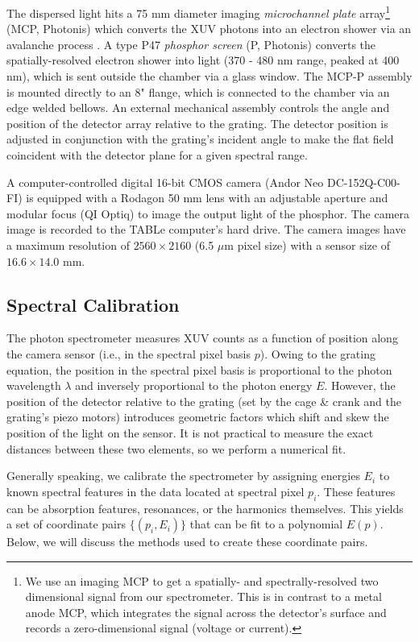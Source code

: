 The dispersed light hits a 75 mm diameter imaging \textit{microchannel plate} array\footnote{We use an imaging MCP to get a spatially- and spectrally-resolved two dimensional signal from our spectrometer. This is in contrast to a metal anode MCP, which integrates the signal across the detector's surface and records a zero-dimensional signal (voltage or current).} (MCP, Photonis) which converts the XUV photons into an electron shower via an avalanche process \cite{ladislaswizaMicrochannelPlateDetectors1979a,fraserGrayImagingUsing1984}. A type P47 \textit{phosphor screen} (P, Photonis) converts the spatially-resolved electron shower into light (370 - 480 nm range, peaked at 400 nm), which is sent outside the chamber via a glass window. The MCP-P assembly is mounted directly to an 8" flange, which is connected to the chamber via an edge welded bellows. An external mechanical assembly controls the angle and position of the detector array relative to the grating. The detector position is adjusted in conjunction with the grating's incident angle to make the flat field coincident with the detector plane for a given spectral range.

A computer-controlled digital 16-bit CMOS camera (Andor Neo DC-152Q-C00-FI) is equipped with a Rodagon 50 mm lens with an adjustable aperture and modular focus (QI Optiq) to image the output light of the phosphor. The camera image is recorded to the TABLe computer's hard drive. The camera images have a maximum resolution of $2560 \times 2160$ (6.5 $\mu$m pixel size) with a sensor size of $16.6 \times 14.0$ mm.

\subsection{Spectral Calibration}
\label{sec:XUV-spectral-calibration}

The photon spectrometer measures XUV counts as a function of position along the camera sensor (i.e., in the spectral pixel basis $p$). Owing to the grating equation, the position in the spectral pixel basis is proportional to the photon wavelength $\lambda$ and inversely proportional to the photon energy $E$. However, the position of the detector relative to the grating (set by the cage \& crank and the grating's piezo motors) introduces geometric factors which shift and skew the position of the light on the sensor. It is not practical to measure the exact distances between these two elements, so we perform a numerical fit.

Generally speaking, we calibrate the spectrometer by assigning energies $E_i$ to known spectral features in the data located at spectral pixel $p_i$. These features can be absorption features, resonances, or the harmonics themselves. This yields a set of coordinate pairs $\{(p_i,E_i)\}$ that can be fit to a polynomial $E(p)$. Below, we will discuss the methods used to create these coordinate pairs.

